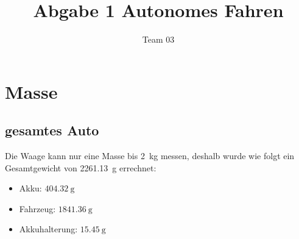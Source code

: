 \documentclass[10pt]{article}
\author{Team 03}
\title{Abgabe 1 Autonomes Fahren}
\begin{document}
\maketitle
\tableofcontents

\section{Masse}
    \subsection{gesamtes Auto}
    Die Waage kann nur eine Masse bis \SI{2}{\kilogram} messen, deshalb wurde wie folgt ein Gesamtgewicht von \SI{2261,13}{\gram} errechnet:
    \begin{multicols}{3}
    \begin{itemize}
        \item Akku: $\SI{404,32}{\gram}$
        \item Fahrzeug: $\SI{1841,36}{\gram}$
        \item Akkuhalterung: $\SI{15,45}{\gram}$
    \end{itemize}
    \end{multicols}
\end{document}
